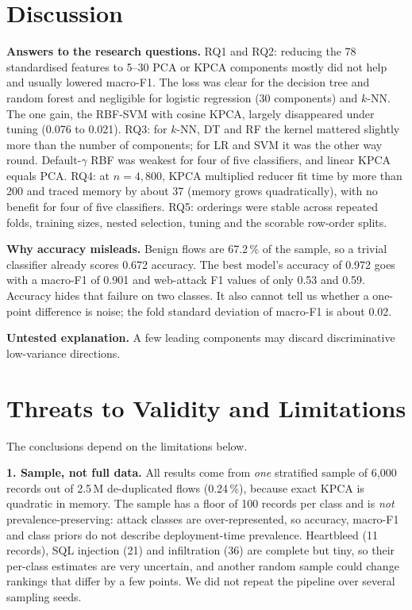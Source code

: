 \documentclass[runningheads]{llncs}
\begin{document}
\section{Discussion}
\textbf{Answers to the research questions.} RQ1 and RQ2: reducing the 78 standardised features to 5--30 PCA or KPCA components mostly did not help and usually lowered macro-F1. The loss was clear for the decision tree and random forest and negligible for logistic regression (30 components) and $k$-NN. The one gain, the RBF-SVM with cosine KPCA, largely disappeared under tuning (0.076 to 0.021). RQ3: for $k$-NN, DT and RF the kernel mattered slightly more than the number of components; for LR and SVM it was the other way round. Default-$\gamma$ RBF was weakest for four of five classifiers, and linear KPCA equals PCA. RQ4: at $n=4{,}800$, KPCA multiplied reducer fit time by more than 200 and traced memory by about 37 (memory grows quadratically), with no benefit for four of five classifiers. RQ5: orderings were stable across repeated folds, training sizes, nested selection, tuning and the scorable row-order splits.

\textbf{Why accuracy misleads.} Benign flows are 67.2\,\% of the sample, so a trivial classifier already scores 0.672 accuracy. The best model's accuracy of 0.972 goes with a macro-F1 of 0.901 and web-attack F1 values of only 0.53 and 0.59. Accuracy hides that failure on two classes. It also cannot tell us whether a one-point difference is noise; the fold standard deviation of macro-F1 is about 0.02.

\textbf{Untested explanation.} A few leading components may discard discriminative low-variance directions.

\section{Threats to Validity and Limitations}
The conclusions depend on the limitations below.

\textbf{1. Sample, not full data.} All results come from \emph{one} stratified sample of 6{,}000 records out of 2.5\,M de-duplicated flows (0.24\,\%), because exact KPCA is quadratic in memory. The sample has a floor of 100 records per class and is \emph{not} prevalence-preserving: attack classes are over-represented, so accuracy, macro-F1 and class priors do not describe deployment-time prevalence. Heartbleed (11 records), SQL injection (21) and infiltration (36) are complete but tiny, so their per-class estimates are very uncertain, and another random sample could change rankings that differ by a few points. We did not repeat the pipeline over several sampling seeds.
\end{document}
